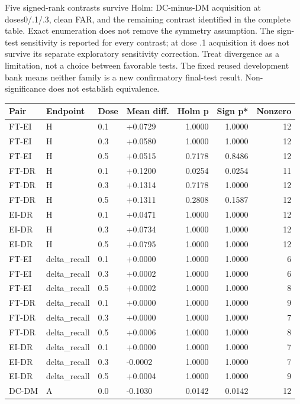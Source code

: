 \documentclass[10pt,a4paper]{article}
\begin{document}
Five signed-rank contrasts survive Holm: DC-minus-DM acquisition at doses0/.1/.3, clean FAR, and the remaining contrast identified in the complete table. Exact enumeration does not remove the symmetry assumption. The sign-test sensitivity is reported for every contrast; at dose .1 acquisition it does not survive its separate exploratory sensitivity correction. Treat divergence as a limitation, not a choice between favorable tests. The fixed reused development bank means neither family is a new confirmatory final-test result. Non-significance does not establish equivalence.
\begin{longtable}{llllrrr}
\toprule
Pair & Endpoint & Dose & Mean diff. & Holm p & Sign p* & Nonzero\\
\midrule
\endhead
FT-EI & H & 0.1 & +0.0729 & 1.0000 & 1.0000 & 12\\
FT-EI & H & 0.3 & +0.0580 & 1.0000 & 1.0000 & 12\\
FT-EI & H & 0.5 & +0.0515 & 0.7178 & 0.8486 & 12\\
FT-DR & H & 0.1 & +0.1200 & 0.0254 & 0.0254 & 11\\
FT-DR & H & 0.3 & +0.1314 & 0.7178 & 1.0000 & 12\\
FT-DR & H & 0.5 & +0.1311 & 0.2808 & 0.1587 & 12\\
EI-DR & H & 0.1 & +0.0471 & 1.0000 & 1.0000 & 12\\
EI-DR & H & 0.3 & +0.0734 & 1.0000 & 1.0000 & 12\\
EI-DR & H & 0.5 & +0.0795 & 1.0000 & 1.0000 & 12\\
FT-EI & delta\_recall & 0.1 & +0.0000 & 1.0000 & 1.0000 & 6\\
FT-EI & delta\_recall & 0.3 & +0.0002 & 1.0000 & 1.0000 & 6\\
FT-EI & delta\_recall & 0.5 & +0.0002 & 1.0000 & 1.0000 & 8\\
FT-DR & delta\_recall & 0.1 & +0.0000 & 1.0000 & 1.0000 & 9\\
FT-DR & delta\_recall & 0.3 & +0.0000 & 1.0000 & 1.0000 & 7\\
FT-DR & delta\_recall & 0.5 & +0.0006 & 1.0000 & 1.0000 & 8\\
EI-DR & delta\_recall & 0.1 & +0.0000 & 1.0000 & 1.0000 & 7\\
EI-DR & delta\_recall & 0.3 & -0.0002 & 1.0000 & 1.0000 & 7\\
EI-DR & delta\_recall & 0.5 & +0.0004 & 1.0000 & 1.0000 & 9\\
DC-DM & A & 0.0 & -0.1030 & 0.0142 & 0.0142 & 12\\

\end{longtable}
\end{document}

